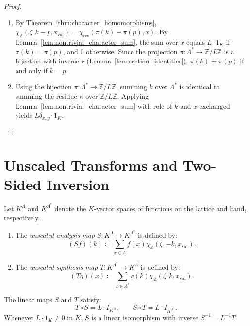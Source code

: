 \begin{proof}
\begin{enumerate}
    \item By Theorem~\ref{thm:character_homomorphisms}, $\chi_{\mathbb{Z}}(\zeta, k - p, x_{\mathrm{val}}) = \chi_{\mathrm{res}}(\pi(k) - \pi(p), x)$.
    By Lemma~\ref{lem:nontrivial_character_sum}, the sum over $x$ equals $L \cdot 1_K$ if $\pi(k) = \pi(p)$, and $0$ otherwise.
    Since the projection $\pi: \Lambda^* \to \mathbb{Z}/L\mathbb{Z}$ is a bijection with inverse $r$ (Lemma~\ref{lem:section_identities}), $\pi(k) = \pi(p)$ if and only if $k = p$.
    \item Using the bijection $\pi: \Lambda^* \to \mathbb{Z}/L\mathbb{Z}$, summing $k$ over $\Lambda^*$ is identical to summing the residue $\kappa$ over $\mathbb{Z}/L\mathbb{Z}$.
    Applying Lemma~\ref{lem:nontrivial_character_sum} with role of $k$ and $x$ exchanged yields $L \delta_{x, y} \cdot 1_K$.
\end{enumerate}
\end{proof}

\section{Unscaled Transforms and Two-Sided Inversion}

\begin{definition}
Let $K^\Lambda$ and $K^{\Lambda^*}$ denote the $K$-vector spaces of functions on the lattice and band, respectively.
\begin{enumerate}
    \item The \emph{unscaled analysis map} $S: K^\Lambda \to K^{\Lambda^*}$ is defined by:
    \begin{equation}
    (S f)(k) \coloneqq \sum_{x \in \Lambda} f(x) \chi_{\mathbb{Z}}(\zeta, -k, x_{\mathrm{val}}).
    \end{equation}
    \item The \emph{unscaled synthesis map} $T: K^{\Lambda^*} \to K^\Lambda$ is defined by:
    \begin{equation}
    (T g)(x) \coloneqq \sum_{k \in \Lambda^*} g(k) \chi_{\mathbb{Z}}(\zeta, k, x_{\mathrm{val}}).
    \end{equation}
\end{enumerate}
\end{definition}

\begin{theorem}
\label{thm:a01_unscaled_inversion}
The linear maps $S$ and $T$ satisfy:
\begin{equation}
T \circ S = L \cdot I_{K^\Lambda}, \qquad S \circ T = L \cdot I_{K^{\Lambda^*}}.
\end{equation}
Whenever $L \cdot 1_K \neq 0$ in $K$, $S$ is a linear isomorphism with inverse $S^{-1} = L^{-1} T$.
\end{theorem}

